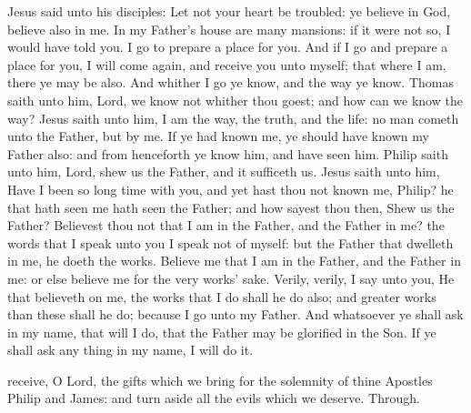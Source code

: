 
 Jesus said unto his disciples: Let not your heart be troubled: ye believe in God, believe also in me. In my Father's house are many mansions: if it were not so, I would have told you. I go to prepare a place for you. And if I go and prepare a place for you, I will come again, and receive you unto myself; that where I am, there ye may be also. And whither I go ye know, and the way ye know. Thomas saith unto him, Lord, we know not whither thou goest; and how can we know the way? Jesus saith unto him, I am the way, the truth, and the life: no man cometh unto the Father, but by me. If ye had known me, ye should have known my Father also: and from henceforth ye know him, and have seen him. Philip saith unto him, Lord, shew us the Father, and it sufficeth us. Jesus saith unto him, Have I been so long time with you, and yet hast thou not known me, Philip? he that hath seen me hath seen the Father; and how sayest thou then, Shew us the Father? Believest thou not that I am in the Father, and the Father in me? the words that I speak unto you I speak not of myself: but the Father that dwelleth in me, he doeth the works. Believe me that I am in the Father, and the Father in me: or else believe me for the very works' sake. Verily, verily, I say unto you, He that believeth on me, the works that I do shall he do also; and greater works than these shall he do; because I go unto my Father. And whatsoever ye shall ask in my name, that will I do, that the Father may be glorified in the Son. If ye shall ask any thing in my name, I will do it.


\secret
{} receive, O Lord, the gifts which we bring for the solemnity of thine Apostles Philip and James: and turn aside all the evils which we deserve. Through.

\clearpage
{}

